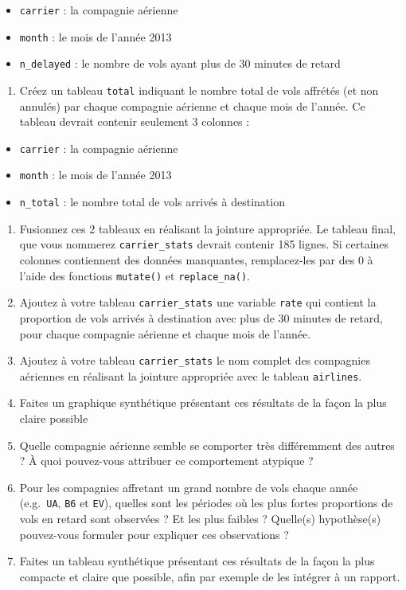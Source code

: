 \documentclass[a4paperpaper,]{article}
\providecommand{\tightlist}{%
  \setlength{\itemsep}{0pt}\setlength{\parskip}{0pt}}
\theoremstyle{definition}
\theoremstyle{definition}
\theoremstyle{definition}
\theoremstyle{remark}
\begin{document}
\begin{itemize}
\tightlist
\item
  \texttt{carrier} : la compagnie aérienne
\item
  \texttt{month} : le mois de l'année 2013
\item
  \texttt{n\_delayed} : le nombre de vols ayant plus de 30 minutes de
  retard
\end{itemize}

\begin{enumerate}
\def\labelenumi{\arabic{enumi}.}
\setcounter{enumi}{1}
\tightlist
\item
  Créez un tableau \texttt{total} indiquant le nombre total de vols
  affrétés (et non annulés) par chaque compagnie aérienne et chaque mois
  de l'année. Ce tableau devrait contenir seulement 3 colonnes :
\end{enumerate}

\begin{itemize}
\tightlist
\item
  \texttt{carrier} : la compagnie aérienne
\item
  \texttt{month} : le mois de l'année 2013
\item
  \texttt{n\_total} : le nombre total de vols arrivés à destination
\end{itemize}

\begin{enumerate}
\def\labelenumi{\arabic{enumi}.}
\setcounter{enumi}{2}
\item
  Fusionnez ces 2 tableaux en réalisant la jointure appropriée. Le
  tableau final, que vous nommerez \texttt{carrier\_stats} devrait
  contenir 185 lignes. Si certaines colonnes contiennent des données
  manquantes, remplacez-les par des 0 à l'aide des fonctions
  \texttt{mutate()} et \texttt{replace\_na()}.
\item
  Ajoutez à votre tableau \texttt{carrier\_stats} une variable
  \texttt{rate} qui contient la proportion de vols arrivés à destination
  avec plus de 30 minutes de retard, pour chaque compagnie aérienne et
  chaque mois de l'année.
\item
  Ajoutez à votre tableau \texttt{carrier\_stats} le nom complet des
  compagnies aériennes en réalisant la jointure appropriée avec le
  tableau \texttt{airlines}.
\item
  Faites un graphique synthétique présentant ces résultats de la façon
  la plus claire possible
\item
  Quelle compagnie aérienne semble se comporter très différemment des
  autres ? À quoi pouvez-vous attribuer ce comportement atypique ?
\item
  Pour les compagnies affretant un grand nombre de vols chaque année
  (e.g.~\texttt{UA}, \texttt{B6} et \texttt{EV}), quelles sont les
  périodes où les plus fortes proportions de vols en retard sont
  observées ? Et les plus faibles ? Quelle(s) hypothèse(s) pouvez-vous
  formuler pour expliquer ces observations ?
\item
  Faites un tableau synthétique présentant ces résultats de la façon la
  plus compacte et claire que possible, afin par exemple de les intégrer
  à un rapport.
\end{enumerate}


\end{document}
